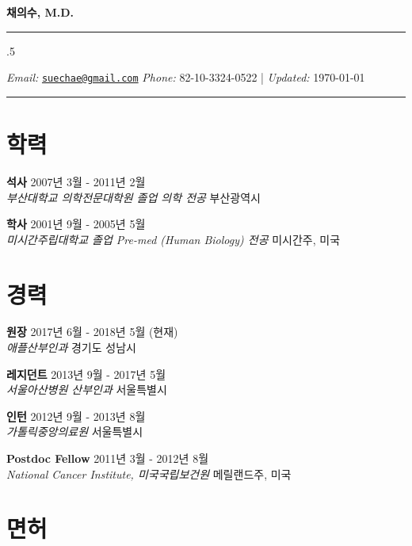 \documentclass[12pt,]{article}
\begin{document}
\centerline{\huge \bf 채의수, M.D.}

\vspace{2 mm}

\hrule

\vspace{2 mm}



\moveleft.5\hoffset\centerline{ \emph{Email:} \href{mailto:}{\href{mailto:suechae@gmail.com}{\nolinkurl{suechae@gmail.com}}} \hspace{1 mm} \emph{Phone:}  82-10-3324-0522  \hspace{1 mm}       | \emph{Updated:} \today}

\vspace{2 mm}

\hrule


\section{학력}

\textbf{석사} \hfill 2007년 3월 - 2011년 2월\\
\emph{부산대학교 의학전문대학원 졸업 \textbar{} 의학 전공}
\hfill 부산광역시

\textbf{학사} \hfill 2001년 9월 - 2005년 5월\\
\emph{미시간주립대학교 졸업 \textbar{} Pre-med (Human Biology) 전공}
\hfill 미시간주, 미국

\section{경력}

\textbf{원장} \hfill 2017년 6월 - 2018년 5월 (현재)\\
\emph{애플산부인과} \hfill 경기도 성남시

\textbf{레지던트} \hfill 2013년 9월 - 2017년 5월\\
\emph{서울아산병원 산부인과} \hfill 서울특별시

\textbf{인턴} \hfill 2012년 9월 - 2013년 8월\\
\emph{가톨릭중앙의료원} \hfill 서울특별시

\textbf{Postdoc Fellow} \hfill 2011년 3월 - 2012년 8월\\
\emph{National Cancer Institute, 미국국립보건원} \hfill 메릴랜드주, 미국

\section{면허}
\end{document}
